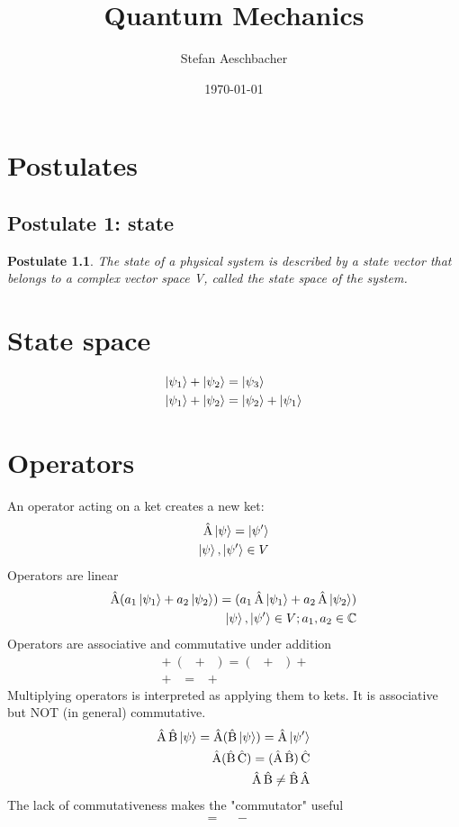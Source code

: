 \documentclass[10pt,a4paper]{book}
\title{Quantum Mechanics}
\author{Stefan Aeschbacher}
\date{\today}
\newtheorem{post}{Postulate}
\DeclareMathOperator {\opA} {\hat{A}}
\DeclareMathOperator {\opB} {\hat{B}}
\DeclareMathOperator {\opC} {\hat{C}}
\begin{document}
    \maketitle


    \chapter{Postulates}
    \section{Postulate 1: state}
    
    \begin{post}
    The state of a physical system is described by a state vector that belongs to a complex vector space V, called the state space of the system.
    \end{post}
    
    \chapter{State space}
    \begin{align}
    \ket{ \psi_1} + \ket{ \psi_2} &= \ket{ \psi_3} \\
    \ket{ \psi_1} + \ket{ \psi_2} &= \ket{ \psi_2} + \ket{ \psi_1}
    \end{align}
    \chapter{Operators}
    An operator acting on a ket creates a new ket:
    \begin{align}
    \opA \ket{\psi} = \ket{\psi'} \\
    \ket{\psi}, \ket{\psi'} \in V
    \end{align}
    Operators are linear
    \begin{align}
    \opA (a_1\ket{\psi_1} + a_2\ket{\psi_2}) = (a_1\opA\ket{\psi_1} + a_2\opA\ket{\psi_2}) \\
    \ket{\psi}, \ket{\psi'} \in V; a_1, a_2 \in \mathbb{C}
    \end{align}
    Operators are associative and commutative under addition
    \begin{align}
    \opA + (\opB + \opC) = (\opA + \opB) + \opC \\
    \opA + \opB = \opB + \opA 
    \end{align}
    Multiplying operators is interpreted as applying them to kets. It is associative but NOT (in general) commutative.
    \begin{align}
    \opA\opB\ket{\psi} = \opA(\opB\ket{\psi}) = \opA\ket{\psi'} \\
    \opA(\opB\opC) = (\opA\opB)\opC \\
    \opA\opB \ne \opB\opA
    \end{align}
    The lack of commutativeness makes the "commutator" useful
    \begin{align}
    [\opA, \opB] = \opA\opB - \opB\opA \\
    \end{align}    
\end{document}
